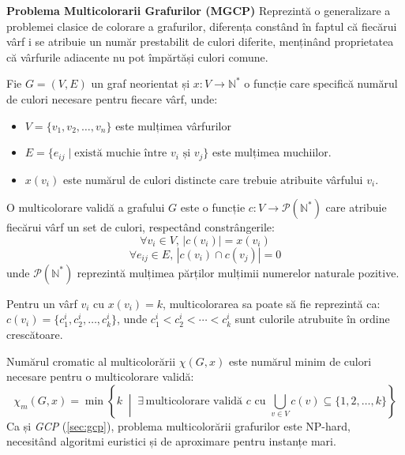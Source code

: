 {\bf Problema Multicolorarii Grafurilor (MGCP)}
 Reprezintă o generalizare a problemei clasice de colorare a grafurilor, diferența constând în faptul că fiecărui vârf i se atribuie un număr prestabilit de culori diferite, menținând proprietatea că vârfurile adiacente nu pot împărtăși culori comune.
\begin{Def}
  Fie $G=(V,E)$ un graf neorientat și $x: V \rightarrow \mathbb{N}^*$ o funcție care specifică numărul de culori necesare pentru fiecare vârf, unde:
  \begin{itemize}
    \item $V = \{v_1, v_2, \ldots, v_n\}$ este mulțimea vârfurilor
    \item $E = \{e_{ij} \mid \text{există muchie între } v_i \text{ și } v_j\}$ este mulțimea muchiilor.
    \item $x(v_i)$ este numărul de culori distincte care trebuie atribuite vârfului $v_i$.
   
  \end{itemize}
   \end{Def}

  O multicolorare validă a grafului $G$ este o funcție $c:V \rightarrow  \mathcal{P}(\mathbb{N}^*)$ care atribuie fiecărui vârf un set de culori, respectând
  constrângerile:
  \begin{equation}
    \forall v_i \in V,\, | c(v_i)|= x(v_i)
     \end{equation}
     \begin{equation}
     \forall e_{ij} \in E,\, |c(v_i) \cap c(v_j)| = 0
  \end{equation}
  unde $\mathcal{P}(\mathbb{N}^*)$ reprezintă mulțimea părților mulțimii numerelor naturale pozitive.

  Pentru un vârf $v_i$ cu $x(v_i)=k$, multicolorarea sa poate să fie reprezintă ca: $c(v_i)=\{c_1^i,c_2^i, \ldots, c_k^i\}$, unde $c_1^i < c_2^i < \cdots < c_k^i$ sunt culorile atrubuite în ordine crescătoare.

  Numărul cromatic al multicolorării $\chi(G,x)$ este numărul minim de culori necesare pentru o multicolorare validă:
\begin{equation}
\chi_m(G,x) = \min\left\{k \;\middle|\; \exists\, \text{multicolorare validă } c \text{ cu } \bigcup_{v \in V} c(v) \subseteq \{1, 2, \ldots, k\} \right\}
\end{equation}
Ca și \textit{GCP} (\ref{sec:gcp}), problema multicolorării grafurilor este NP-hard, necesitând algoritmi euristici și de aproximare pentru instanțe mari.


